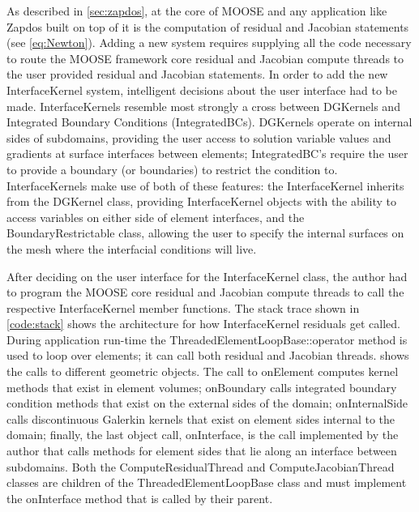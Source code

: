 As described in \cref{sec:zapdos}, at the core of MOOSE and any application like Zapdos built on top of it is the computation of residual and Jacobian statements (see \cref{eq:Newton}). Adding a new system requires supplying all the code necessary to route the MOOSE framework core residual and Jacobian compute threads to the user provided residual and Jacobian statements. In order to add the new InterfaceKernel system, intelligent decisions about the user interface had to be made. InterfaceKernels resemble most strongly a cross between DGKernels and Integrated Boundary Conditions (IntegratedBCs). DGKernels operate on internal sides of subdomains, providing the user access to solution variable values and gradients at surface interfaces between elements; IntegratedBC's require the user to provide a boundary (or boundaries) to restrict the condition to. InterfaceKernels make use of both of these features: the InterfaceKernel inherits from the DGKernel class, providing InterfaceKernel objects with the ability to access variables on either side of element interfaces, and the BoundaryRestrictable class, allowing the user to specify the internal surfaces on the mesh where the interfacial conditions will live.

After deciding on the user interface for the InterfaceKernel class, the author had to program the MOOSE core residual and Jacobian compute threads to call the respective InterfaceKernel member functions. The stack trace shown in \cref{code:stack} shows the architecture for how InterfaceKernel residuals get called. During application run-time the ThreadedElementLoopBase::operator method is used to loop over elements; it can call both residual and Jacobian threads.  shows the calls to different geometric objects. The call to onElement computes kernel methods that exist in element volumes; onBoundary calls integrated boundary condition methods that exist on the external sides of the domain; onInternalSide calls discontinuous Galerkin kernels that exist on element sides internal to the domain; finally, the last object call, onInterface, is the call implemented by the author that calls methods for element sides that lie along an interface between subdomains. Both the ComputeResidualThread and ComputeJacobianThread classes are children of the ThreadedElementLoopBase class and must implement the onInterface method that is called by their parent.

